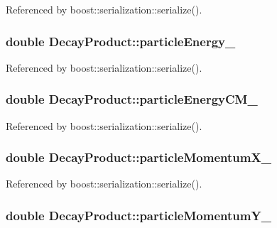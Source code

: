 Referenced by boost\-::serialization\-::serialize().

\hypertarget{classDecayProduct_a118e0199e06a0e42f226ef2033346380}{
\subsubsection[{particle\-Energy\-\_\-}]{\setlength{\rightskip}{0pt plus 5cm}double Decay\-Product\-::particle\-Energy\-\_\-}}\label{classDecayProduct_a118e0199e06a0e42f226ef2033346380}


Referenced by boost\-::serialization\-::serialize().

\hypertarget{classDecayProduct_a674fd452946e449ccaf9255e8e0094b1}{
\subsubsection[{particle\-Energy\-C\-M\-\_\-}]{\setlength{\rightskip}{0pt plus 5cm}double Decay\-Product\-::particle\-Energy\-C\-M\-\_\-}}\label{classDecayProduct_a674fd452946e449ccaf9255e8e0094b1}


Referenced by boost\-::serialization\-::serialize().

\hypertarget{classDecayProduct_aacbc3eba4f785c7eeb43aa5f5c02dbcf}{
\subsubsection[{particle\-Momentum\-X\-\_\-}]{\setlength{\rightskip}{0pt plus 5cm}double Decay\-Product\-::particle\-Momentum\-X\-\_\-}}\label{classDecayProduct_aacbc3eba4f785c7eeb43aa5f5c02dbcf}


Referenced by boost\-::serialization\-::serialize().

\hypertarget{classDecayProduct_a351e4d1c64cacd628b353552fe0437ac}{
\subsubsection[{particle\-Momentum\-Y\-\_\-}]{\setlength{\rightskip}{0pt plus 5cm}double Decay\-Product\-::particle\-Momentum\-Y\-\_\-}}\label{classDecayProduct_a351e4d1c64cacd628b353552fe0437ac}


